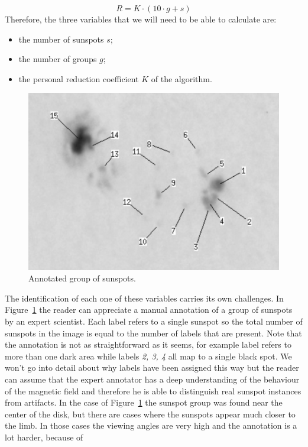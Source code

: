 \begin{equation}
  R = K \cdot (10 \cdot g + s)
\end{equation}
Therefore, the three variables that we will need to be able to calculate are:
\begin{itemize}
  \item the number of sunspots $s$;
  \item the number of groups $g$;
  \item the personal reduction coefficient $K$ of the algorithm.
\end{itemize}
\begin{figure}[b!]
    \centering
    \captionsetup{justification=centering}
    \includegraphics[width=\textwidth]{./pictures/sunspot-annotation}
    \caption{Annotated group of sunspots.}
    \label{fig:sunspot-annotation}
\end{figure}
The identification of each one of these variables carries its own challenges. In Figure~\ref{fig:sunspot-annotation} the reader can appreciate a manual annotation of a group of sunspots by an expert scientist. Each label refers to a single sunspot so the total number of sunspots in the image is equal to the number of labels that are present. Note that the annotation is not as straightforward as it seems, for example label  refers to more than one dark area while labels \textit{2, 3, 4} all map to a single black spot. We won't go into detail about why labels have been assigned this way but the reader can assume that the expert annotator has a deep understanding of the behaviour of the magnetic field and therefore he is able to distinguish real sunspot instances from artifacts. In the case of Figure~\ref{fig:sunspot-annotation} the sunspot group was found near the center of the disk, but there are cases where the sunspots appear much closer to the limb. In those cases the viewing angles are very high and the annotation is a lot harder, because of
